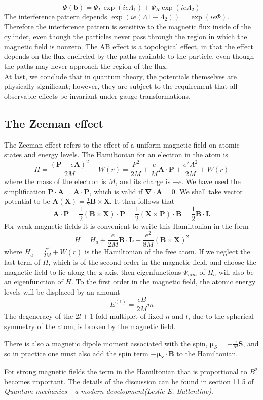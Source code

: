 \[\Psi(\bm{b}) = \Psi_L\exp(ie\Lambda_1) + \Psi_R\exp(ie\Lambda_2)\]
The interference pattern depends $\exp(ie(\Lambda1-\Lambda_2)) = \exp(ie\Phi)$. 
Therefore the interference pattern is sensitive to the magnetic flux inside of the cylinder, even though the particles never pass through the region in which the magnetic field is nonzero. 
The AB effect is a topological effect, in that the effect depends on the flux encircled by the paths available to the particle, even though the paths may never approach the region of the flux. \\
At last, we conclude that in quantum theory, the potentials themselves are physically significant; however, they are subject to the requirement that all observable effects be invariant under gauge transformations.

\subsection{The Zeeman effect}
The Zeeman effect refers to the effect of a uniform magnetic field on atomic states and energy levels.
The Hamiltonian for an electron in the atom is
\[H = \frac{(\bm{P}+e\bm{A})^2}{2M} + W(r) = \frac{P^2}{2M} + \frac{e}{M}\bm{A}\cdot\bm{P} + \frac{e^2A^2}{2M} + W(r)\]
where the mass of the electron is $M$, and its charge is $-e$. We have used the simplification $\bm{P}\cdot\bm{A} = \bm{A}\cdot\bm{P}$, which is valid if $\bm{\nabla}\cdot\bm{A}=0$. 
We shall take vector potential to be $\bm{A}(\bm{X}) = \frac{1}{2}\bm{B}\times\bm{X}$. It then follows that
\[\bm{A}\cdot\bm{P} = \frac{1}{2}(\bm{B}\times\bm{X})\cdot\bm{P} = \frac{1}{2}(\bm{X}\times\bm{P})\cdot\bm{B} = \frac{1}{2} \bm{B}\cdot\bm{L}\]
For weak magnetic fields it is convenient to write this Hamiltonian in the form
\[H = H_a + \frac{e}{2M} \bm{B}\cdot\bm{L} + \frac{e^2}{8M}(\bm{B}\times\bm{X})^2\]
where $H_a = \frac{P^2}{2M} + W(r)$ is the Hamiltonian of the free atom.
If we neglect the last term of $H$, which is of the second order in the magnetic field, and choose the magnetic field to lie along the z axis, then eigenfunctions $\Psi_{nlm}$ of $H_a$ will also be an eigenfunction of $H$. To the first order in the magnetic field, the atomic energy levels will be displaced by an amount
\[E^{(1)} = \frac{eB}{2M}m\]
The degeneracy of the $2l+1$ fold multiplet of fixed $n$ and $l$, due to the spherical symmetry of the atom, is broken by the magnetic field.
\begin{note}
There is also a magnetic dipole moment associated with the spin, $\bm{\mu}_{S} = -\frac{e}{M}\bm{S}$, and so in practice one must also add the spin term $-\bm{\mu}_{S} \cdot \bm{B}$ to the Hamiltonian.
\end{note}
For strong magnetic fields the term in the Hamiltonian that is proportional to $B^2$ becomes important. The details of the discussion can be found in section 11.5 of \emph{Quantum mechanics - a modern development(Leslie E. Ballentine)}.

